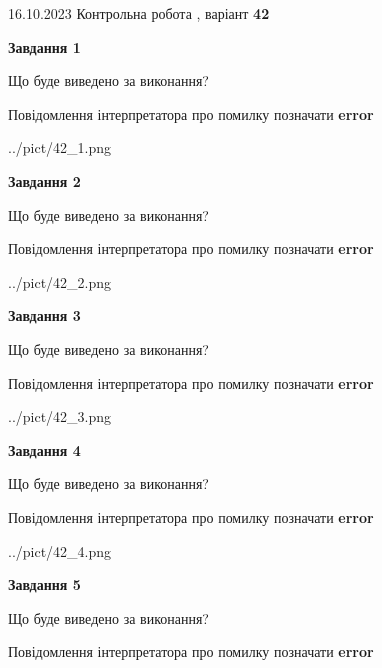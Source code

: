 \documentclass[12pt, ukrainian]{article}
\begin{document}
{\Large{16.10.2023 Контрольна робота , варіант  \No \textbf { 42 }\par}}
{
\begin {large}
{\begin {center}\textbf{Завдання 1}\end {center}}\par
Що буде виведено за виконання? \par
Повідомлення інтерпретатора про помилку позначати \textbf{error}

\begin{center}
	{../pict/42_1.png}
\end{center}
\newpage

{\begin {center}\textbf{Завдання 2}\end {center}}\par
Що буде виведено за виконання? \par
Повідомлення інтерпретатора про помилку позначати \textbf{error}

\begin{center}
	{../pict/42_2.png}
\end{center}
\newpage

{\begin {center}\textbf{Завдання 3}\end {center}}\par
Що буде виведено за виконання? \par
Повідомлення інтерпретатора про помилку позначати \textbf{error}

\begin{center}
	{../pict/42_3.png}
\end{center}
\newpage

{\begin {center}\textbf{Завдання 4}\end {center}}\par
Що буде виведено за виконання? \par
Повідомлення інтерпретатора про помилку позначати \textbf{error}

\begin{center}
	{../pict/42_4.png}
\end{center}
\newpage

{\begin {center}\textbf{Завдання 5}\end {center}}\par
Що буде виведено за виконання? \par
Повідомлення інтерпретатора про помилку позначати \textbf{error}


\end{large}}
\end{document}
